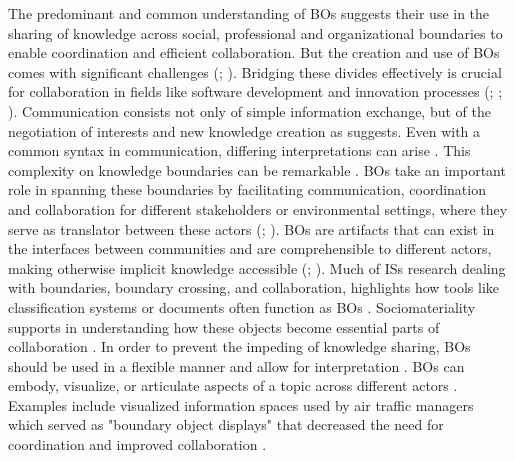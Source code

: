 \documentclass[12pt,oneside]{article}
\begin{document}
The predominant and common understanding of \ac{BO}s suggests their use in the sharing of knowledge across social, professional and organizational boundaries to enable coordination and efficient collaboration. But the creation and use of \ac{BO}s comes with significant challenges (\citealp[307-308]{rosenkranz2014boundary}; \citealp[3]{gantman2014communication}). Bridging these divides effectively is crucial for collaboration in fields like software development and innovation processes (\citealp[18]{marheineke2016importance}; \citealp[9]{koskinen2005metaphoric}; \citealp[11]{gantman2014communication}). \newline
Communication consists not only of simple information exchange, but of the negotiation of interests and new knowledge creation as \citet[11]{gantman2014communication} suggests. Even with a common syntax in communication, differing interpretations can arise \citep[444]{carlile2002pragmatic}. This complexity on knowledge boundaries can be remarkable \citep[328, 332]{rosenkranz2014boundary}. \ac{BO}s take an important role in spanning these boundaries by facilitating communication, coordination and collaboration for different stakeholders or environmental settings, where they serve as translator between these actors (\citealp[6372]{vanlooy2024theoretical}; \citealp[1813, 1817]{huvila2017boundary}). 
\ac{BO}s are artifacts that can exist in the interfaces between communities and are comprehensible to different actors, making otherwise implicit knowledge accessible (\citealp[1817]{huvila2017boundary}; \citealp[466]{hsiao2012collaborative}). Much of \ac{IS}s research dealing with boundaries, boundary crossing, and collaboration, highlights how tools like classification systems or documents often function as \ac{BO}s \citep[1816-1817]{huvila2017boundary}. \newline
Sociomateriality supports in understanding how these objects become essential parts of collaboration \citep[582]{doolin2012sociomateriality}. In order to prevent the impeding of knowledge sharing, \ac{BO}s should be used in a flexible manner and allow for interpretation \citep[1814-1815]{huvila2017boundary}. \ac{BO}s can embody, visualize, or articulate aspects of a topic across different actors \citep[486]{hsiao2012collaborative}. Examples include visualized information spaces used by air traffic managers which served as "boundary object displays" that decreased the need for coordination and improved collaboration \citep[1813]{huvila2017boundary}. \newline
\end{document}
